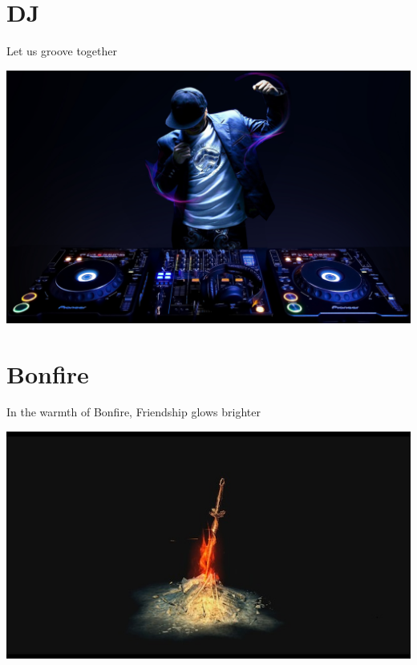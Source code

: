 \documentclass[makeidx, 11pt, oneside, onecolumn, openright, final, svgnames, dvipsnames, extrafontsizes]{memoir}
\begin{document}
\chapter{DJ}
\thispagestyle{empty}
\begin{center}
Let us groove together
\end{center}
\begin{center}
\includegraphics[scale=1]{dj.jpeg}
\end{center}



\chapter{Bonfire}
\thispagestyle{empty}
\begin{center}
In the warmth of Bonfire, Friendship glows brighter %
\end{center}
\begin{center}
\includegraphics[scale=1]{bonfire.jpg}
\end{center}
\end{document}
